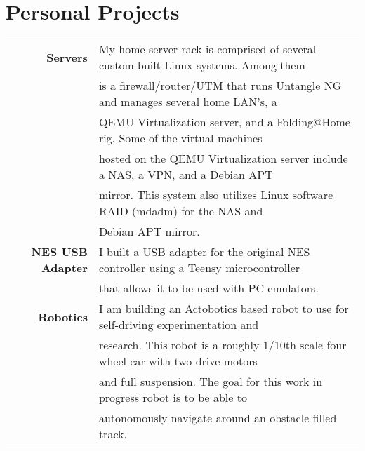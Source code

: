 \documentclass[letterpaper,10pt]{article}
\begin{document}
	\section*{Personal Projects}
        \vspace*{1ex}
        \begin{tabular}{rl}
            \textbf{Servers} & My home server rack is comprised of several custom built Linux systems. Among them \\
                             & is a firewall/router/UTM that runs Untangle NG and manages several home LAN's, a \\
                             & QEMU Virtualization server, and a Folding@Home rig. Some of the virtual machines \\
                             & hosted on the QEMU Virtualization server include a NAS, a VPN, and a Debian APT \\
                             & mirror. This system also utilizes Linux software RAID (mdadm) for the NAS and \\
                             & Debian APT mirror.\\[1ex]
            \textbf{NES USB Adapter} & I built a USB adapter for the original NES controller using a Teensy microcontroller \\
                                     & that allows it to be used with PC emulators. \\[1ex]
            \textbf{Robotics} & I am building an Actobotics based robot to use for self-driving experimentation and \\
                              & research. This robot is a roughly 1/10th scale four wheel car with two drive motors \\
                              & and full suspension. The goal for this work in progress robot is to be able to \\
                              & autonomously navigate around an obstacle filled track. \\[1ex]
        \end{tabular}
\end{document}
